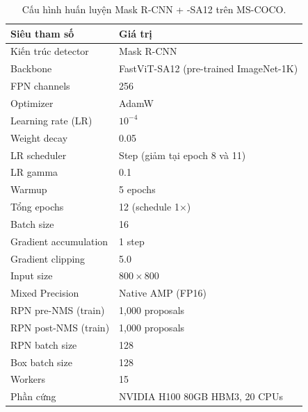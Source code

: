 \begin{table}[H]
\centering
\caption{Cấu hình huấn luyện Mask R-CNN + \fastvit{}-SA12 trên MS-COCO.}
\label{tab:training_config_det}
\begin{tabular}{l l}
\toprule
\textbf{Siêu tham số} & \textbf{Giá trị} \\
\midrule
Kiến trúc detector & Mask R-CNN \\
Backbone & FastViT-SA12 (pre-trained ImageNet-1K) \\
FPN channels & 256 \\
Optimizer & AdamW \\
Learning rate (LR) & $10^{-4}$ \\
Weight decay & 0.05 \\
LR scheduler & Step (giảm tại epoch 8 và 11) \\
LR gamma & 0.1 \\
Warmup & 5 epochs \\
Tổng epochs & 12 (schedule 1$\times$) \\
Batch size & 16 \\
Gradient accumulation & 1 step \\
Gradient clipping & 5.0 \\
Input size & $800 \times 800$ \\
Mixed Precision & Native AMP (FP16) \\
RPN pre-NMS (train) & 1{,}000 proposals \\
RPN post-NMS (train) & 1{,}000 proposals \\
RPN batch size & 128 \\
Box batch size & 128 \\
Workers & 15 \\
Phần cứng & NVIDIA H100 80GB HBM3, 20 CPUs \\
\bottomrule
\end{tabular}
\end{table}

